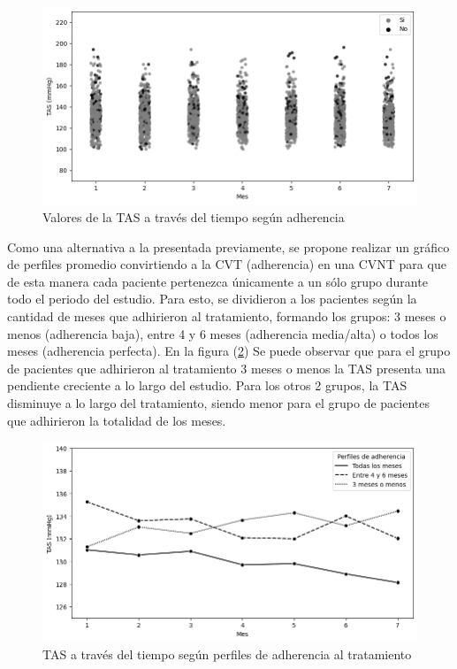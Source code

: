 \documentclass[spanish]{article}
\numberwithin{figure}{subsection}
\numberwithin{equation}{subsection}
\numberwithin{table}{subsection}
\begin{document}
\begin{figure}[H]
	\centering
	\includegraphics[scale=0.5]{img/TAS_vs_tpo_with_adherencia_scatter.png}
	\caption{Valores de la TAS a través del tiempo según adherencia}
	\label{TAS_with_adh_scatter}
\end{figure}

Como una alternativa a la presentada previamente, se propone realizar un gráfico
de perfiles promedio convirtiendo a la CVT (adherencia) en una CVNT para que de
esta manera cada paciente pertenezca únicamente a un sólo grupo durante todo el
periodo del estudio. Para esto, se dividieron a los pacientes según la cantidad
de meses que adhirieron al tratamiento, formando los grupos: 3 meses o menos
(adherencia baja), entre 4 y 6 meses (adherencia media/alta) o todos los meses
(adherencia perfecta). En la figura (\ref{TAS_with_adh}) Se puede observar que
para el grupo de pacientes que adhirieron al tratamiento 3 meses o menos la TAS
presenta una pendiente creciente a lo largo del estudio. Para los otros 2
grupos, la TAS disminuye a lo largo del tratamiento, siendo menor para el grupo
de pacientes que adhirieron la totalidad de los meses.

\begin{figure}[H]
	\centering
	\includegraphics[scale=0.5]{img/TAS_vs_tpo_with_adherencia.png}
	\caption{TAS a través del tiempo según perfiles de adherencia al tratamiento}
	\label{TAS_with_adh}
\end{figure}
\end{document}

